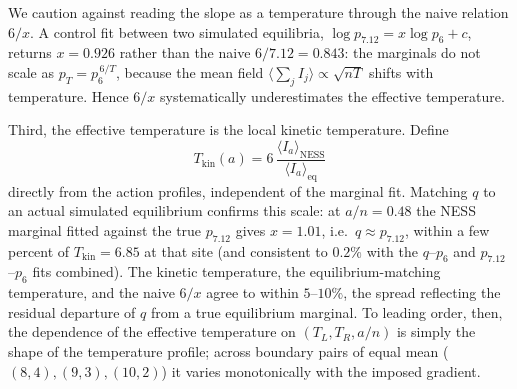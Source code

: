 \documentclass[11pt,a4paper]{article}
\theoremstyle{definition}
\numberwithin{equation}{section}   %
\begin{document}
We caution against reading the slope as a temperature through the naive
relation $6/x$. A control fit between two simulated equilibria,
$\log p_{7.12}=x\log p_6+c$, returns $x=0.926$ rather than the naive
$6/7.12=0.843$: the marginals do not scale as $p_T=p_6^{\,6/T}$,
because the mean field $\langle\sum_j I_j\rangle\propto\sqrt{nT}$ shifts with
temperature. Hence $6/x$ systematically underestimates the effective
temperature.

Third, the effective temperature is the local kinetic temperature. Define
\[
  T_{\mathrm{kin}}(a)=
  6\,\frac{\langle I_a\rangle_{\mathrm{NESS}}}
          {\langle I_a\rangle_{\mathrm{eq}}}
\]
directly from the action profiles, independent of the marginal fit. Matching
$q$ to an actual simulated equilibrium confirms
this scale: at $a/n=0.48$ the NESS marginal fitted against the true $p_{7.12}$
gives $x=1.01$, i.e.\ $q\approx p_{7.12}$, within a few percent of
$T_{\mathrm{kin}}=6.85$ at that site (and consistent to $0.2\%$ with the
$q$--$p_6$ and $p_{7.12}$--$p_6$ fits combined). The kinetic temperature, the
equilibrium-matching temperature, and the naive $6/x$ agree to within
$5$--$10\%$, the spread reflecting the residual departure of $q$ from a true
equilibrium marginal. To leading order, then, the dependence of the effective
temperature on $(T_L,T_R,a/n)$ is simply the shape of the temperature profile;
across boundary pairs of equal mean ($(8,4),(9,3),(10,2)$) it varies
monotonically with the imposed gradient.
\end{document}
